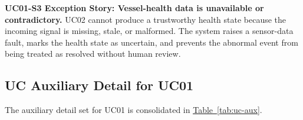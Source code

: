 \documentclass[10pt,a4paper]{article}
\let\orighyperref\hyperref
\renewcommand{\hyperref}[2][]{\orighyperref[#1]{\uline{#2}}}
\begin{document}
\textbf{UC01-S3 Exception Story: Vessel-health data is unavailable or contradictory.} UC02 cannot produce a trustworthy health state because the incoming signal is missing, stale, or malformed. The system raises a sensor-data fault, marks the health state as uncertain, and prevents the abnormal event from being treated as resolved without human review.

\subsection*{UC Auxiliary Detail for UC01}
{}
\label{sec:uc01-aux}

The auxiliary detail set for UC01 is consolidated in \hyperref[tab:uc-aux]{Table~\ref*{tab:uc-aux}}.
\end{document}
